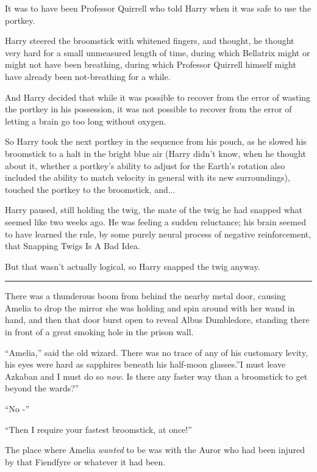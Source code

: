 It was to have been Professor Quirrell who told Harry when it was safe
to use the portkey.

Harry steered the broomstick with whitened fingers, and thought, he
thought very hard for a small unmeasured length of time, during which
Bellatrix might or might not have been breathing, during which Professor
Quirrell himself might have already been not-breathing for a while.

And Harry decided that while it was possible to recover from the error
of wasting the portkey in his possession, it was not possible to recover
from the error of letting a brain go too long without oxygen.

So Harry took the next portkey in the sequence from his pouch, as he
slowed his broomstick to a halt in the bright blue air (Harry didn't
know, when he thought about it, whether a portkey's ability to adjust
for the Earth's rotation also included the ability to match velocity in
general with its new surroundings), touched the portkey to the
broomstick, and...

Harry paused, still holding the twig, the mate of the twig he had
snapped what seemed like two weeks ago. He was feeling a sudden
reluctance; his brain seemed to have learned the rule, by some purely
neural process of negative reinforcement, that Snapping Twigs Is A Bad
Idea.

But that wasn't actually logical, so Harry snapped the twig anyway.

\begin{center}\rule{3in}{0.4pt}\end{center}

There was a thunderous boom from behind the nearby metal door, causing
Amelia to drop the mirror she was holding and spin around with her wand
in hand, and then that door burst open to reveal Albus Dumbledore,
standing there in front of a great smoking hole in the prison wall.

``Amelia,'' said the old wizard. There was no trace of any of his
customary levity, his eyes were hard as sapphires beneath his half-moon
glasses.''I must leave Azkaban and I must do so \emph{now}. Is there any
faster way than a broomstick to get beyond the wards?''

``No -''

``Then I require your fastest broomstick, at once!''

The place where Amelia \emph{wanted} to be was with the Auror who had
been injured by that Fiendfyre or whatever it had been.

